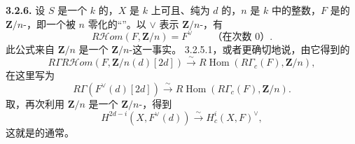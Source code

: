 \textbf{3.2.6.} 设 $S$ 是一个 $k$ 的，$X$ 是 $k$ 上可且、纯为 $d$ 的，$n$ 是 $k$ 中的整数，$F$ 是的 $\mathbf Z/n$-，即一个被 $n$ 零化的“”。以 $\vee$ 表示 $\mathbf Z/n$-，有
\[
 R\mathscr Hom(F,\mathbf Z/n)=F^\vee\qquad\text{（在次数 0）}.
\]
此公式来自 $\mathbf Z/n$ 是一个 $\mathbf Z/n$-这一事实。 3.2.5.1，或者更确切地说，由它得到的
\[
 R\Gamma R\mathscr Hom(F,\mathbf Z/n(d)[2d])\xrightarrow{\sim}
 R\operatorname{Hom}(R\Gamma_c(F),\mathbf Z/n),
\]
在这里写为
\[
 R\Gamma(F^\vee(d)[2d])\xrightarrow{\sim}
 R\operatorname{Hom}(R\Gamma_c(F),\mathbf Z/n).\tag{3.2.6.1}
\]
取，再次利用 $\mathbf Z/n$ 是一个 $\mathbf Z/n$-，得到
\[
 H^{2d-i}(X,F^\vee(d))\xrightarrow{\sim}H_c^i(X,F)^\vee,\tag{3.2.6.2}
\]
这就是的通常。

